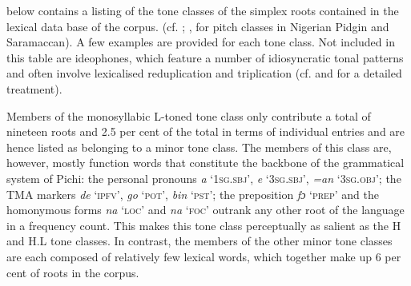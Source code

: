  below contains a listing of the tone classes of the simplex roots contained in the lexical data base of the corpus. (cf. \citealt{Faraclas1996}; \citealt{Good2004}, for pitch classes in Nigerian Pidgin and Saramaccan). A few examples are provided for each tone class. Not included in this table are ideophones, which feature a number of idiosyncratic tonal patterns and often involve lexicalised reduplication and triplication (cf.  and  for a detailed treatment).

Members of the monosyllabic L-toned tone class only contribute a total of nineteen roots and 2.5 per cent of the total in terms of individual entries and are hence listed as belonging to a minor tone class. The members of this class are, however, mostly function words that constitute the backbone of the grammatical system of Pichi: the personal pronouns \textit{a} ‘\textsc{1sg.sbj}’, \textit{e} ‘\textsc{3sg.sbj}’, \textit{=an} ‘\textsc{3sg.obj}’; the \textsc{TMA} markers \textit{de} ‘\textsc{ipfv}’, \textit{go} ‘\textsc{pot}’, \textit{bin} ‘\textsc{pst}’; the preposition \textit{fɔ} ‘\textsc{prep}’ and the homonymous forms \textit{na} ‘\textsc{loc}’ and \textit{na} ‘\textsc{foc}’ outrank any other root of the language in a frequency count. This makes this tone class perceptually as salient as the H and H.L tone classes. In contrast, the members of the other minor tone classes are each  composed of relatively few lexical words, which together make up 6 per cent of roots in the corpus. 


